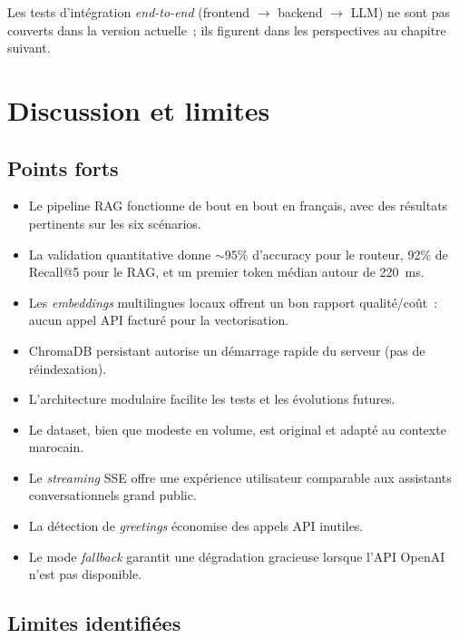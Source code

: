 Les tests d'intégration \textit{end-to-end} (frontend $\to$ backend $\to$ \ac{LLM}) ne sont pas couverts dans la version actuelle~; ils figurent dans les perspectives au chapitre suivant.

\section{Discussion et limites}

\subsection{Points forts}

\begin{itemize}
  \item Le pipeline \ac{RAG} fonctionne de bout en bout en français, avec des résultats pertinents sur les six scénarios.
  \item La validation quantitative donne ${\sim}95\%$ d'accuracy pour le routeur, 92\% de Recall@5 pour le \ac{RAG}, et un premier token médian autour de 220~ms.
  \item Les \textit{embeddings} multilingues locaux offrent un bon rapport qualité/coût~: aucun appel \ac{API} facturé pour la vectorisation.
  \item ChromaDB persistant autorise un démarrage rapide du serveur (pas de réindexation).
  \item L'architecture modulaire facilite les tests et les évolutions futures.
  \item Le dataset, bien que modeste en volume, est original et adapté au contexte marocain.
  \item Le \textit{streaming} \ac{SSE} offre une expérience utilisateur comparable aux assistants conversationnels grand public.
  \item La détection de \textit{greetings} économise des appels \ac{API} inutiles.
  \item Le mode \textit{fallback} garantit une dégradation gracieuse lorsque l'\ac{API} OpenAI n'est pas disponible.
\end{itemize}

\subsection{Limites identifiées}

